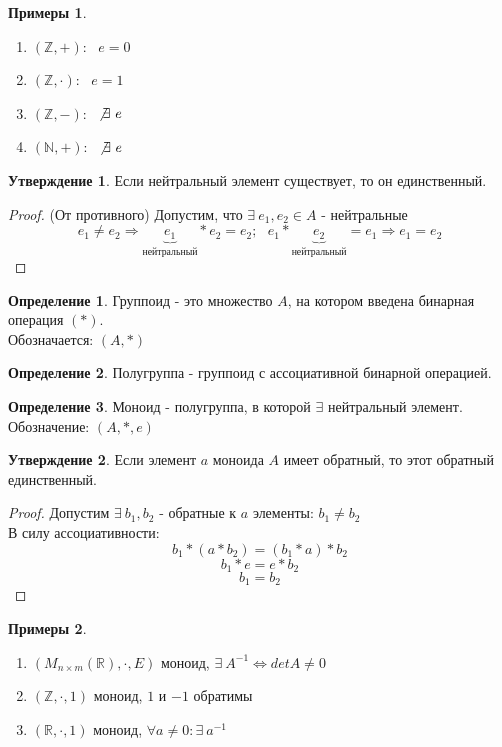 \documentclass[a4paper, 12pt]{article}
\newcommand{\R}{\mathbb R}
\newcommand{\Z}{\mathbb Z}
\newcommand{\N}{\mathbb N}
\newcommand\tab[1][.5cm]{\hspace*{#1}}
\theoremstyle{definition}
\newtheorem*{definition}{Определение}
\newtheorem*{subtheorem}{Утверждение}
\newtheorem*{example}{Примеры}
\begin{document}
  \begin{example}
    \begin{enumerate} \tab
      \item $(\Z, +)$: \ $e=0$  
      \item $(\Z, \cdot)$: \ $e=1$ 
      \item $(\Z, -)$: \ $\not \exists \ e$ 
      \item $(\N, +)$: \ $\not \exists \ e$ 
    \end{enumerate}
  \end{example}
  \begin{subtheorem}
    Если нейтральный элемент существует, то он единственный. 
  \end{subtheorem} 
  \begin{proof}
    (От противного) Допустим, что $\exists \ e_1,e_2 \in A$ - нейтральные
    $$e_1 \not = e_2 \Longrightarrow \underbrace{e_1}_{\text{нейтральный}}* e_2 = e_2; \ \ \ e_1 * \underbrace{e_2}_{\text{нейтральный}}= e_1 \Longrightarrow e_1 = e_2$$ 
  \end{proof} 
  \begin{definition}
    Группоид - это множество $A$, на котором введена бинарная операция $(*)$. \\
    Обозначается: $(A,*)$  
  \end{definition} 
  \begin{definition}
    Полугруппа - группоид с ассоциативной бинарной операцией.
  \end{definition} 
  \begin{definition}
    Моноид - полугруппа, в которой $\exists $ нейтральный элемент.\\ Обозначение: $(A,*,e)$ 
  \end{definition} 
  \begin{subtheorem}
    Если элемент $a$ моноида $A$ имеет обратный, то этот обратный единственный. 
  \end{subtheorem}
  \begin{proof}
    Допустим $\exists \ b_1,b_2$ - обратные к $a$ элементы: $b_1 \not = b_2$ \\
    В силу ассоциативности:
    $$b_1 * (a * b_2) = (b_1 * a) * b_2$$
    $$b_1 * e = e * b_2$$ 
    $$b_1 = b_2$$ 
  \end{proof} 
  \begin{example}
    \begin{enumerate} \tab
      \item $(M_{n \times m}(\R), \cdot, E)$ моноид, $\exists \ A^{-1} \Longleftrightarrow detA \not = 0$ 
      \item $(\Z, \cdot, 1)$ моноид, $1$ и $-1$ обратимы  
      \item $(\R, \cdot, 1)$ моноид, $\forall a \not =0:  \exists \ a^{-1}$ 
    \end{enumerate}
  \end{example}
\end{document}
